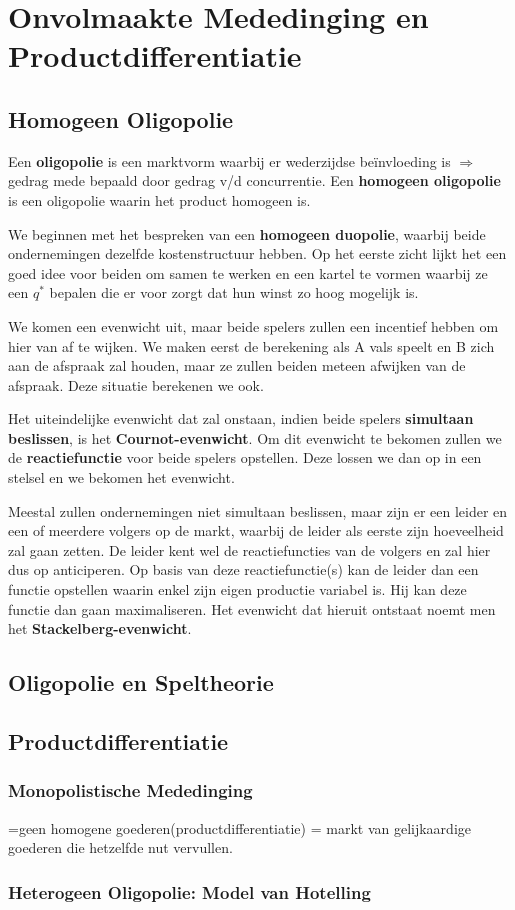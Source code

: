 \section{Onvolmaakte Mededinging en Productdifferentiatie}

\subsection{Homogeen Oligopolie}
Een \textbf{oligopolie} is een marktvorm waarbij er wederzijdse be\"invloeding is $\Rightarrow$ gedrag mede bepaald door gedrag v/d concurrentie. Een \textbf{homogeen oligopolie} is een oligopolie waarin het product homogeen is.

We beginnen met het bespreken van een \textbf{homogeen duopolie}, waarbij beide ondernemingen dezelfde kostenstructuur hebben. Op het eerste zicht lijkt het een goed idee voor beiden om samen te werken en een kartel te vormen waarbij ze een $q^*$ bepalen die er voor zorgt dat hun winst zo hoog mogelijk is.
%

We komen een evenwicht uit, maar beide spelers zullen een incentief hebben om hier van af te wijken. We maken eerst de berekening als A vals speelt en B zich aan de afspraak zal houden, maar ze zullen beiden meteen afwijken van de afspraak. Deze situatie berekenen we ook.
%

Het uiteindelijke evenwicht dat zal onstaan, indien beide spelers \textbf{simultaan beslissen}, is het \textbf{Cournot-evenwicht}. Om dit evenwicht te bekomen zullen we de \textbf{reactiefunctie} voor beide spelers opstellen. Deze lossen we dan op in een stelsel en we bekomen het evenwicht.

Meestal zullen ondernemingen niet simultaan beslissen, maar zijn er een leider en een of meerdere volgers op de markt, waarbij de leider als eerste zijn hoeveelheid zal gaan zetten. De leider kent wel de reactiefuncties van de volgers en zal hier dus op anticiperen. Op basis van deze reactiefunctie(s) kan de leider dan een functie opstellen waarin enkel zijn eigen productie variabel is. Hij kan deze functie dan gaan maximaliseren. Het evenwicht dat hieruit ontstaat noemt men het \textbf{Stackelberg-evenwicht}.


\subsection{Oligopolie en Speltheorie}

\subsection{Productdifferentiatie}
\subsubsection{Monopolistische Mededinging}
=geen homogene goederen(productdifferentiatie) = markt van gelijkaardige goederen die hetzelfde nut vervullen.

\subsubsection{Heterogeen Oligopolie: Model van Hotelling}
